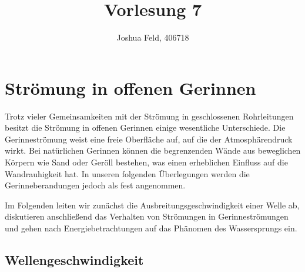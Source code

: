 \documentclass{lecture}
\institute{Lehrstuhl für Strömungslehre und Aerodynamisches Institut}
\title{Vorlesung 7}
\author{Joshua Feld, 406718}
\begin{document}
    \maketitle


    \section*{Strömung in offenen Gerinnen}
    
    Trotz vieler Gemeinsamkeiten mit der Strömung in geschlossenen Rohrleitungen besitzt die Strömung in offenen Gerinnen einige wesentliche Unterschiede.
    Die Gerinneströmung weist eine freie Oberfläche auf, auf die der Atmosphärendruck wirkt.
    Bei natürlichen Gerinnen können die begrenzenden Wände aus beweglichen Körpern wie Sand oder Geröll bestehen, was einen erheblichen Einfluss auf die Wandrauhigkeit hat.
    In unseren folgenden Überlegungen werden die Gerinneberandungen jedoch als fest angenommen.
    
    Im Folgenden leiten wir zunächst die Ausbreitungsgeschwindigkeit einer Welle ab, diskutieren anschließend das Verhalten von Strömungen in Gerinneströmungen und gehen nach Energiebetrachtungen auf das Phänomen des Wassersprungs ein.
    
    
    \subsection*{Wellengeschwindigkeit}
    
\end{document}
